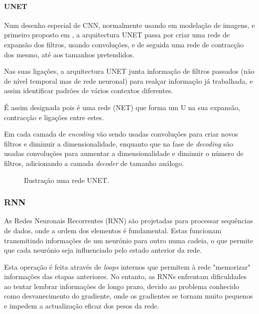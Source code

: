 \paragraph{UNET\label{se:unet_sec}}
\text{ }  \par
Num desenho especial de \gls{CNN}, normalmente usando em modelação de imagens, e primeiro proposto em \cite{Shelhamer2014}, a arquitectura UNET passa por criar uma rede de expansão dos filtros, usando convoluções, e de seguida uma rede de contracção dos mesmo, até aos tamanhos pretendidos.\par
Nas suas ligações, a arquitectura UNET junta informação de filtros passados (não de nível temporal mas de rede neuronal) para realçar informação já trabalhada, e assim identificar padrões de vários contextos diferentes.\par
É assim designada pois é uma rede (NET) que forma um U na sua expansão, contracção e ligações entre estes.\par
Em cada camada de \textit{encoding} vão sendo usadas convoluções para criar novos filtros e diminuir a dimensionalidade, enquanto que na fase de \textit{decoding} são usadas convoluções para aumentar a dimensionalidade e diminuir o número de filtros, adicionando a camada \textit{decoder} de tamanho análogo.\par

\begin{figure}[H]
	\centering
	\resizebox{\linewidth}{!}{}
	\caption{Ilustração uma rede UNET.}
	\label{fig:unet_graph}
\end{figure}


\subsubsection{RNN\label{se:rnn_sec}}

As Redes Neuronais Recorrentes (RNN) são projetadas para processar sequências de dados, onde a ordem dos elementos é fundamental. Estas funcionam transmitindo informações de um neurónio para outro numa cadeia, o que permite que cada neurónio seja influenciado pelo estado anterior da rede.\par
Esta operação é feita através de \textit{loops} internos que permitem à rede "memorizar" informações das etapas anteriores. No entanto, as RNNs enfrentam dificuldades ao tentar lembrar informações de longo prazo, devido ao problema conhecido como desvanecimento do gradiente, onde os gradientes se tornam muito pequenos e impedem a actualização eficaz dos pesos da rede.\par

